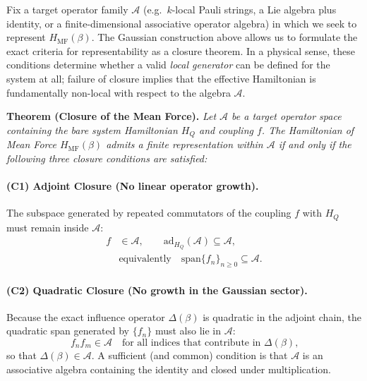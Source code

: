 Fix a target operator family $\mathcal A$ (e.g.\ $k$-local Pauli strings, a Lie algebra plus identity,
or a finite-dimensional associative operator algebra) in which we seek to represent $H_{\mathrm{MF}}(\beta)$.
The Gaussian construction above allows us to formulate the exact criteria for representability as a closure theorem.
In a physical sense, these conditions determine whether a valid \emph{local generator} can be defined for the system at all;
failure of closure implies that the effective Hamiltonian is fundamentally non-local with respect to the algebra $\mathcal A$.

\vspace{0.5em}
\noindent\textbf{Theorem (Closure of the Mean Force).}
\textit{Let $\mathcal A$ be a target operator space containing the bare system Hamiltonian $H_Q$ and coupling $f$. The Hamiltonian of Mean Force $H_{\mathrm{MF}}(\beta)$ admits a finite representation within $\mathcal A$ if and only if the following three closure conditions are satisfied:}

\paragraph{(C1) Adjoint Closure (No linear operator growth).}
The subspace generated by repeated commutators of the coupling $f$ with $H_Q$ must remain inside $\mathcal A$:
\begin{equation}
    \begin{split}
        f & \in\mathcal A,\qquad \mathrm{ad}_{H_Q}(\mathcal A)\subseteq \mathcal A,     \\
          & \text{equivalently}\quad \mathrm{span}\{f_n\}_{n\ge 0}\subseteq \mathcal A.
    \end{split}
    \label{eq:C1_adjoint_closure}
\end{equation}

\paragraph{(C2) Quadratic Closure (No growth in the Gaussian sector).}
Because the exact influence operator $\Delta(\beta)$ is quadratic in the adjoint chain,
the quadratic span generated by $\{f_n\}$ must also lie in $\mathcal A$:
\begin{equation}
    f_n f_m \in \mathcal A\quad \text{for all indices that contribute in $\Delta(\beta)$,}
    \label{eq:C2_product_closure}
\end{equation}
so that $\Delta(\beta)\in\mathcal A$. A sufficient (and common) condition is that $\mathcal A$ is an
associative algebra containing the identity and closed under multiplication.

